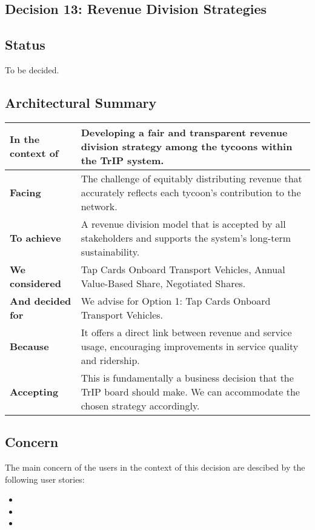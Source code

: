 \subsection{Decision 13: Revenue Division Strategies}

\subsection*{Status}
To be decided.

\subsection*{Architectural Summary}
\begin{tabular}{|p{3.5cm}|p{10.5cm}|}
    \hline
    \textbf{In the context of} & Developing a fair and transparent revenue division strategy among the tycoons within the TrIP system. \\
    \hline
    \textbf{Facing} & The challenge of equitably distributing revenue that accurately reflects each tycoon's contribution to the network. \\
    \hline
    \textbf{To achieve} & A revenue division model that is accepted by all stakeholders and supports the system's long-term sustainability. \\
    \hline
    \textbf{We considered} & Tap Cards Onboard Transport Vehicles, Annual Value-Based Share, Negotiated Shares. \\
    \hline
    \textbf{And decided for} & We advise for Option 1: Tap Cards Onboard Transport Vehicles. \\
    \hline
    \textbf{Because} & It offers a direct link between revenue and service usage, encouraging improvements in service quality and ridership. \\
    \hline
    \textbf{Accepting} & This is fundamentally a business decision that the TrIP board should make. We can accommodate the chosen strategy accordingly. \\
    \hline
\end{tabular}

\subsection*{Concern}
The main concern of the users in the context of this decision are descibed by the following user stories: 
\begin{itemize}[noitemsep]
    \item \userStoryTwentyOne
    \item \userStoryTwentyThree 
    \item \userStoryTwentyFour
\end{itemize}


